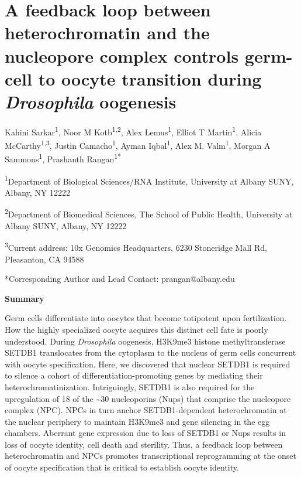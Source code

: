 \documentclass[12pt,oneside]{reedthesis}
\begin{document}
\hypertarget{a-feedback-loop-between-heterochromatin-and-the-nucleopore-complex-controls-germ-cell-to-oocyte-transition-during-drosophila-oogenesis}{%
\chapter{\texorpdfstring{A feedback loop between heterochromatin and the nucleopore complex controls germ-cell to oocyte transition during \emph{Drosophila} oogenesis}{A feedback loop between heterochromatin and the nucleopore complex controls germ-cell to oocyte transition during Drosophila oogenesis}}\label{a-feedback-loop-between-heterochromatin-and-the-nucleopore-complex-controls-germ-cell-to-oocyte-transition-during-drosophila-oogenesis}}

Kahini Sarkar\textsuperscript{1}, Noor M Kotb\textsuperscript{1,2}, Alex Lemus\textsuperscript{1}, Elliot T Martin\textsuperscript{1},
Alicia McCarthy\textsuperscript{1,3}, Justin Camacho\textsuperscript{1}, Ayman Iqbal\textsuperscript{1}, Alex M.
Valm\textsuperscript{1}, Morgan A Sammons\textsuperscript{1}, Prashanth Rangan\textsuperscript{1*}

\textsuperscript{1}Department of Biological Sciences/RNA Institute, University at Albany
SUNY, Albany, NY 12222

\textsuperscript{2}Department of Biomedical Sciences, The School of Public Health,
University at Albany SUNY, Albany, NY 12222

\textsuperscript{3}Current address: 10x Genomics Headquarters, 6230 Stoneridge Mall Rd,
Pleasanton, CA 94588

*Corresponding Author and Lead Contact: prangan@albany.edu

\textbf{Summary}

Germ cells differentiate into oocytes that become totipotent upon
fertilization. How the highly specialized oocyte acquires this distinct
cell fate is poorly understood. During \emph{Drosophila} oogenesis, H3K9me3
histone methyltransferase SETDB1 translocates from the cytoplasm to the
nucleus of germ cells concurrent with oocyte specification. Here, we
discovered that nuclear SETDB1 is required to silence a cohort of
differentiation-promoting genes by mediating their
heterochromatinization. Intriguingly, SETDB1 is also required for the
upregulation of 18 of the \textasciitilde30 nucleoporins (Nups) that comprise the
nucleopore complex (NPC). NPCs in turn anchor SETDB1-dependent
heterochromatin at the nuclear periphery to maintain H3K9me3 and gene
silencing in the egg chambers. Aberrant gene expression due to loss of
SETDB1 or Nups results in loss of oocyte identity, cell death and
sterility. Thus, a feedback loop between heterochromatin and NPCs
promotes transcriptional reprogramming at the onset of oocyte
specification that is critical to establish oocyte identity.
\end{document}
